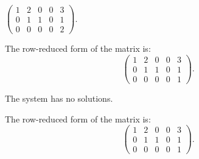 \documentclass{ximera}
\begin{document}
\begin{exercise} \label{c2.3.11b}
$\left(\begin{array}{cccc|c} 1 & 2 & 0 & 0 & 3\\ 0 & 1 & 1 & 0 & 1\\
         0 & 0 & 0 & 0 & 2 \end{array}\right)$.
     \begin{multipleChoice}
     \end{multipleChoice}
     \begin{hint}
       The row-reduced form of the matrix is:
\[
\left(\begin{array}{rrrr|r} 1 & 2 & 0 & 0 & 3 \\
0 & 1 & 1 & 0 & 1 \\ 0 & 0 & 0 & 0 & 1\end{array}\right).
\]
     \end{hint}

\begin{solution}

\ans The system has no solutions.

\soln The row-reduced form of the matrix is:
\[
\left(\begin{array}{rrrr|r} 1 & 2 & 0 & 0 & 3 \\
0 & 1 & 1 & 0 & 1 \\ 0 & 0 & 0 & 0 & 1\end{array}\right).
\]

\end{solution}
\end{exercise}
\end{document}
